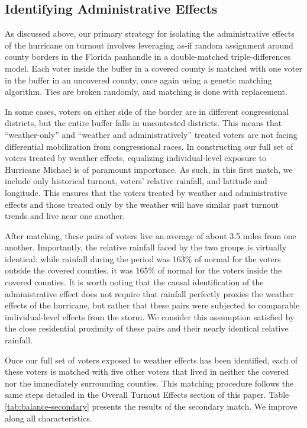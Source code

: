 \documentclass[
  12pt,
]{article}
\begin{document}
\hypertarget{identifying-administrative-effects}{%
\subsection*{Identifying Administrative Effects}\label{identifying-administrative-effects}}

As discussed above, our primary strategy for isolating the administrative effects of the hurricane on turnout involves leveraging as-if random assignment around county borders in the Florida panhandle in a double-matched triple-differences model. Each voter inside the buffer in a covered county is matched with one voter in the buffer in an uncovered county, once again using a genetic matching algorithm. Ties are broken randomly, and matching is done with replacement.

In some cases, voters on either side of the border are in different congressional districts, but the entire buffer falls in uncontested districts. This means that ``weather-only'' and ``weather and administratively'' treated voters are not facing differential mobilization from congressional races. In constructing our full set of voters treated by weather effects, equalizing individual-level exposure to Hurricane Michael is of paramount importance. As such, in this first match, we include only historical turnout, voters' relative rainfall, and latitude and longitude. This ensures that the voters treated by weather and administrative effects and those treated only by the weather will have similar past turnout trends and live near one another.

After matching, these pairs of voters live an average of about 3.5 miles from one another. Importantly, the relative rainfall faced by the two groups is virtually identical: while rainfall during the period was 163\% of normal for the voters outside the covered counties, it was 165\% of normal for the voters inside the covered counties. It is worth noting that the causal identification of the administrative effect does not require that rainfall perfectly proxies the weather effects of the hurricane, but rather that these pairs were subjected to comparable individual-level effects from the storm. We consider this assumption satisfied by the close residential proximity of these pairs and their nearly identical relative rainfall.

Once our full set of voters exposed to weather effects has been identified, each of these voters is matched with five other voters that lived in neither the covered nor the immediately surrounding counties. This matching procedure follows the same steps detailed in the Overall Turnout Effects section of this paper. Table \ref{tab:balance-secondary} presents the results of the secondary match. We improve along all characteristics.
\end{document}
